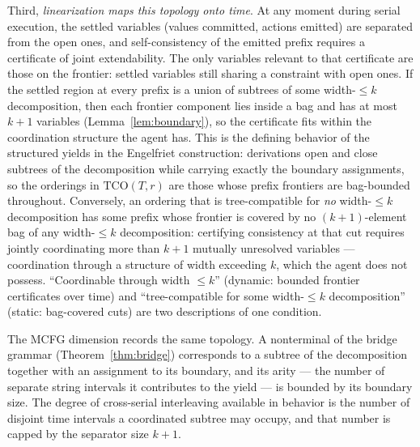 \documentclass[runningheads]{llncs}
\begin{document}
\begin{remark}
Third, \emph{linearization maps this topology onto time}.
At any moment during serial execution, the settled variables (values committed, actions emitted) are separated from the open ones, and self-consistency of the emitted prefix requires a certificate of joint extendability.
The only variables relevant to that certificate are those on the frontier: settled variables still sharing a constraint with open ones.
If the settled region at every prefix is a union of subtrees of some width-$\leq k$ decomposition, then each frontier component lies inside a bag and has at most $k+1$ variables (Lemma~\ref{lem:boundary}), so the certificate fits within the coordination structure the agent has.
This is the defining behavior of the structured yields in the Engelfriet construction: derivations open and close subtrees of the decomposition while carrying exactly the boundary assignments, so the orderings in $\mathrm{TCO}(T, r)$ are those whose prefix frontiers are bag-bounded throughout.
Conversely, an ordering that is tree-compatible for \emph{no} width-$\leq k$ decomposition has some prefix whose frontier is covered by no $(k{+}1)$-element bag of any width-$\leq k$ decomposition: certifying consistency at that cut requires jointly coordinating more than $k+1$ mutually unresolved variables --- coordination through a structure of width exceeding $k$, which the agent does not possess.
``Coordinable through width $\leq k$'' (dynamic: bounded frontier certificates over time) and ``tree-compatible for some width-$\leq k$ decomposition'' (static: bag-covered cuts) are two descriptions of one condition.

The MCFG dimension records the same topology.
A nonterminal of the bridge grammar (Theorem~\ref{thm:bridge}) corresponds to a subtree of the decomposition together with an assignment to its boundary, and its arity --- the number of separate string intervals it contributes to the yield --- is bounded by its boundary size.
The degree of cross-serial interleaving available in behavior is the number of disjoint time intervals a coordinated subtree may occupy, and that number is capped by the separator size $k+1$.
\end{remark}
\end{document}
